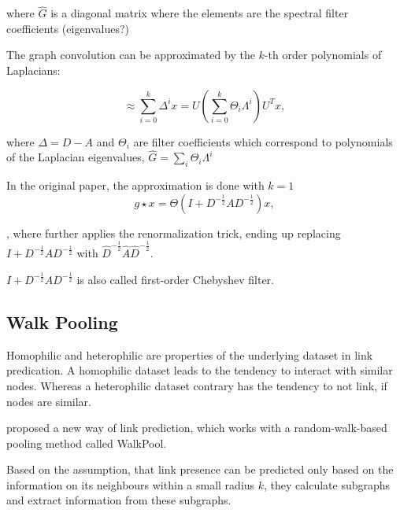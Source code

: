 where $\hat{G}$ is a diagonal matrix where the elements are the 
spectral filter coefficients (eigenvalues?)

The graph convolution can be approximated by the $k$-th order polynomials of Laplacians:

\begin{equation}
    \approx \sum_{i=0}^{k} \Delta^i x = U \left ( \sum_{i=0}^{k}  \Theta_i \Lambda^i \right ) U^T x,
\end{equation}

where $\Delta = D - A$ and $\Theta_i$ are 
filter coefficients which correspond to polynomials of the Laplacian eigenvalues,
 $\hat{G} = \sum_i \Theta_i \Lambda^i$


 In the original \cite{GCN} paper, the approximation is done with $k = 1$ 
 \begin{equation}
     g \star x = \Theta (I + D^{-\frac{1}{2}} A D^{-\frac{1}{2}} )x,
 \end{equation}

, where \citet{GCN} further applies the renormalization trick, ending up replacing
$I + D^{-\frac{1}{2}} A D^{-\frac{1}{2}}$ with $\hat{D}^{-\frac{1}{2}} \hat{A} \hat{D}^{-\frac{1}{2}}$.

$I + D^{-\frac{1}{2}} A D^{-\frac{1}{2}}$ is also called first-order Chebyshev filter.





\subsection{Walk Pooling}

Homophilic and heterophilic are properties of the underlying dataset in link predication. 
A homophilic dataset leads to the tendency to interact with similar nodes. Whereas a heterophilic dataset contrary has the tendency to 
not link, if nodes are similar.

\citet{walkPooling} proposed a new way of link prediction, which works
with a random-walk-based pooling method called WalkPool.

Based on the assumption, that link presence can be predicted 
only based on the information on its neighbours within a small radius $k$,
they calculate subgraphs and extract information from these subgraphs.

